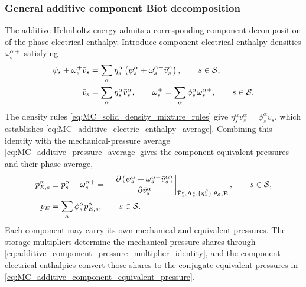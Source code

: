 \subsubsection{General additive component Biot decomposition}
\label{sec:MC_component_biot_derivation}

The additive Helmholtz energy admits a corresponding component decomposition
of the phase electrical enthalpy.  Introduce component electrical enthalpy
densities \(\omega_s^{\alpha+}\) satisfying
%
\begin{subequations}
	\label{eq:MC_additive_electrothermodynamic_decomposition}
	\begin{align}
		\psi_s+\omega_s^+\bar v_s
		 & =
		\sum_\alpha
		\eta_s^\alpha
		\left(
		\psi_s^\alpha+\omega_s^{\alpha+}\bar v_s^\alpha
		\right),
		\qquad
		s\in\mathcal{S},
		\label{eq:MC_additive_electrothermodynamic_energy} \\
		\bar v_s
		 & =
		\sum_\alpha
		\eta_s^\alpha\bar v_s^\alpha,
		\qquad
		\omega_s^+
		=
		\sum_\alpha
		\phi_s^\alpha\omega_s^{\alpha+},
		\qquad
		s\in\mathcal{S} .
		\label{eq:MC_additive_electric_enthalpy_average}
	\end{align}
\end{subequations}
%
The density rules \eqref{eq:MC_solid_density_mixture_rules} give
\(\eta_s^\alpha\bar v_s^\alpha=\phi_s^\alpha\bar v_s\), which establishes
\eqref{eq:MC_additive_electric_enthalpy_average}.  Combining this identity with
the mechanical-pressure average \eqref{eq:MC_additive_pressure_average} gives
the component equivalent pressures and their phase average,
%
\begin{subequations}
	\label{eq:MC_additive_equivalent_pressures}
	\begin{align}
		\bar p_{E,s}^\alpha
		 & \equiv
		\bar p_s^\alpha-\omega_s^{\alpha+}
		=
		-
		\left.
		\frac{\partial 
			\left(
			\psi_s^\alpha+\omega_s^{\alpha+}\bar v_s^\alpha
			\right)
		}{\partial \bar v_s^\alpha}
		\right\vert_{
			\bar{\mathbf{F}}_s^e,\mathbf{A}_s^e,
			\{\eta_s^\beta\},\theta_{\mathcal{S}},\mathbf{E}
		},
		\qquad
		s\in\mathcal{S},
		\label{eq:MC_additive_component_equivalent_pressure} \\
		\bar p_E
		 & =
		\sum_\alpha
		\phi_s^\alpha\bar p_{E,s}^\alpha,
		\qquad
		s\in\mathcal{S} .
		\label{eq:MC_additive_equivalent_pressure_average}
	\end{align}
\end{subequations}
%
Each component may carry its own mechanical and equivalent pressures.  The
storage multipliers determine the mechanical-pressure shares through
\eqref{eq:additive_component_pressure_multiplier_identity}, and the component
electrical enthalpies convert those shares to the conjugate equivalent
pressures in \eqref{eq:MC_additive_component_equivalent_pressure}.

